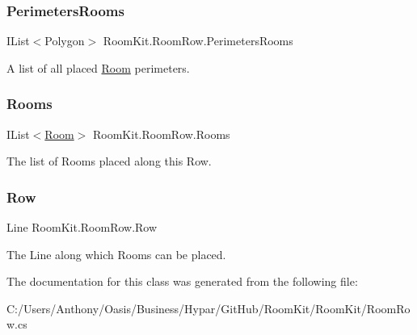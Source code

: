 \mbox{\label{class_room_kit_1_1_room_row_a57619fed2ddba58b0ece1c1d17040d48}} 
\subsubsection{\texorpdfstring{Perimeters\+Rooms}{PerimetersRooms}}
{\footnotesize\ttfamily I\+List$<$Polygon$>$ Room\+Kit.\+Room\+Row.\+Perimeters\+Rooms\hspace{0.3cm}{\ttfamily [get]}}



A list of all placed \mbox{\hyperlink{class_room_kit_1_1_room}{Room}} perimeters. 

\mbox{\label{class_room_kit_1_1_room_row_aa4f80369bb6d0fbf1ae8d5cc31998383}} 
\subsubsection{\texorpdfstring{Rooms}{Rooms}}
{\footnotesize\ttfamily I\+List$<$\mbox{\hyperlink{class_room_kit_1_1_room}{Room}}$>$ Room\+Kit.\+Room\+Row.\+Rooms\hspace{0.3cm}{\ttfamily [get]}}



The list of Rooms placed along this Row. 

\mbox{\label{class_room_kit_1_1_room_row_a5101187caa26266fe0e1487cc6187cd9}} 
\subsubsection{\texorpdfstring{Row}{Row}}
{\footnotesize\ttfamily Line Room\+Kit.\+Room\+Row.\+Row\hspace{0.3cm}{\ttfamily [get]}}



The Line along which Rooms can be placed. 



The documentation for this class was generated from the following file\+:\begin{DoxyCompactItemize}
\item 
C\+:/\+Users/\+Anthony/\+Oasis/\+Business/\+Hypar/\+Git\+Hub/\+Room\+Kit/\+Room\+Kit/Room\+Row.\+cs\end{DoxyCompactItemize}
